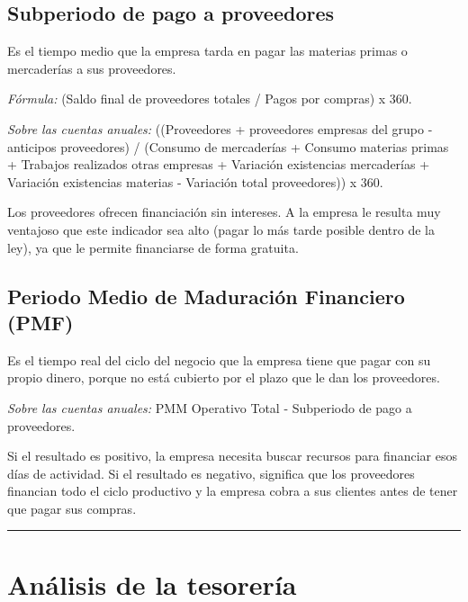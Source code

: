 \documentclass[12pt]{book} %
\begin{document}
\hypertarget{subperiodo-de-pago-a-proveedores}{%
\subsection{Subperiodo de pago a
proveedores}\label{subperiodo-de-pago-a-proveedores}}

Es el tiempo medio que la empresa tarda en pagar las materias primas o
mercaderías a sus proveedores.

\emph{Fórmula:} (Saldo final de proveedores totales / Pagos por compras)
x 360.

\emph{Sobre las cuentas anuales:} ((Proveedores + proveedores empresas
del grupo - anticipos proveedores) / (Consumo de mercaderías + Consumo
materias primas + Trabajos realizados otras empresas + Variación
existencias mercaderías + Variación existencias materias - Variación
total proveedores)) x 360.

Los proveedores ofrecen financiación sin intereses. A la empresa le
resulta muy ventajoso que este indicador sea alto (pagar lo más tarde
posible dentro de la ley), ya que le permite financiarse de forma
gratuita.

\hypertarget{periodo-medio-de-maduraciuxf3n-financiero-pmf}{%
\subsection{Periodo Medio de Maduración Financiero
(PMF)}\label{periodo-medio-de-maduraciuxf3n-financiero-pmf}}

Es el tiempo real del ciclo del negocio que la empresa tiene que pagar
con su propio dinero, porque no está cubierto por el plazo que le dan
los proveedores.

\emph{Sobre las cuentas anuales:} PMM Operativo Total - Subperiodo de
pago a proveedores.

Si el resultado es positivo, la empresa necesita buscar recursos para
financiar esos días de actividad. Si el resultado es negativo, significa
que los proveedores financian todo el ciclo productivo y la empresa
cobra a sus clientes antes de tener que pagar sus compras.

\begin{center}\rule{0.5\linewidth}{0.5pt}\end{center}

\hypertarget{anuxe1lisis-de-la-tesoreruxeda}{%
\section{Análisis de la
tesorería}\label{anuxe1lisis-de-la-tesoreruxeda}}
\end{document}

